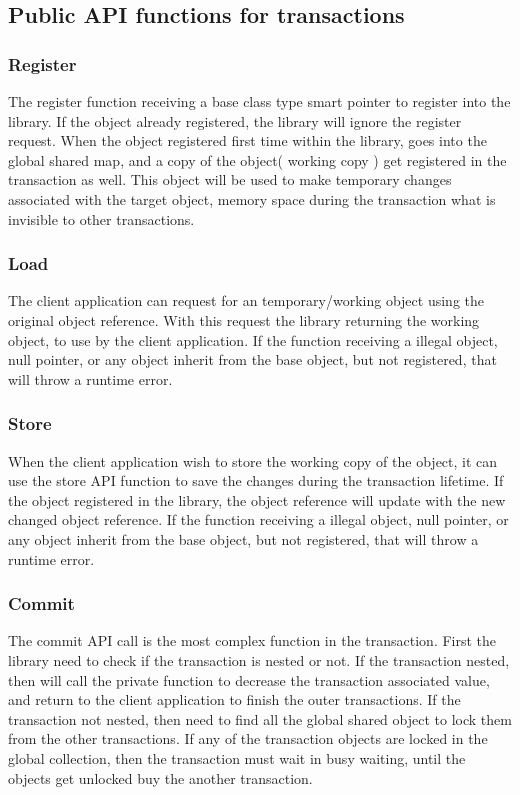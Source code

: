 \documentclass[12pt]{article}
\begin{document}
\newpage
\subsection{Public API functions for transactions}
\subsubsection{Register}
The register function receiving a base class type smart pointer to register into the library. If the object already registered, the library will ignore the register request. When the object registered first time within the library, goes into the global shared map, and a copy of the object( working copy ) get registered in the transaction as well. This object will be used to make temporary changes associated with the target object, memory space during the transaction what is invisible to other transactions. 

\subsubsection{Load}
The client application can request for an temporary/working object using the original object reference. With this request the library returning the working object, to use by the client application. If the function receiving a illegal object, null pointer, or any object inherit from the base object, but not registered, that will throw a runtime error.

\subsubsection{Store}
When the client application wish to store the working copy of the object, it can use the store API function to save the changes during the transaction lifetime. If the object registered in the library, the object reference will update with the new changed object reference. If the function receiving a illegal object, null pointer, or any object inherit from the base object, but not registered, that will throw a runtime error.

\subsubsection{Commit}
The commit API call is the most complex function in the transaction. First the library need to check if the transaction is nested or not. If the transaction nested, then will call the private function to decrease the transaction associated value, and return to the client application to finish the outer transactions. If the transaction not nested, then need to find all the global shared object to lock them from the other transactions. If any of the transaction objects are locked in the global collection, then the transaction must wait in busy waiting, until the objects get unlocked buy the another transaction.\\
\end{document}
